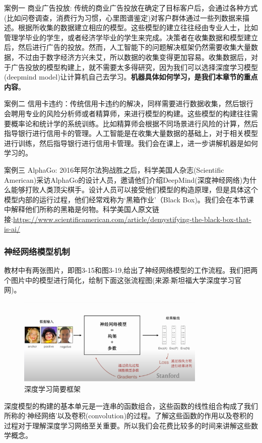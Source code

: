\documentclass[12pt]{article}
\numberwithin{figure}{section}
\newenvironment{fullmodel}{
			\smallskip\noindent
			\begin{minipage}{\textwidth+\marginparwidth+\marginparsep}\smallskip\smallskip}
			{\smallskip\smallskip\end{minipage}\vspace{.1in}
			}
\numberwithin{equation}{section}
\begin{document}

\noindent
\textcolor{deepramp}{案例一} 商业广告投放: 传统的商业广告投放在确定了目标客户后，会通过各种方式(比如问卷调查，消费行为习惯，心里图谱鉴定)对客户群体通过一些列数据来描述。根据所收集的数据建立相应的模型。这些模型的建立往往经由专业人士，比如管理学毕业的学生，或者经济学毕业的学生来完成。决策者在收集数据和模型建立后，然后进行广告的投放。然而，人工智能下的问题解决框架仍然需要收集大量数据，不过由于数字经济方兴未艾，所以数据的收集变得更加容易。收集数据后，对于广告投放的模型构建上，就不需要太多得研究，因为我们可以选择深度学习模型(deepmind model)让计算机自己去学习。\textbf{机器具体如何学习，是我们本章节的重点内容}。

\hfil

\noindent
\textcolor{deepramp}{案例二} 信用卡违约：传统信用卡违约的解决，同样需要进行数据收集，然后银行会聘用专业的风险分析师或者精算师，来进行模型的构建。这些模型的构建往往需要概率论和统计学的系统训练。比如精算师会根据不同场景进行风险的计算，然后指导银行进行信用卡的管理。人工智能是在收集大量数据的基础上，对于相关模型进行训练，然后指导银行进行信用卡管理。我们会在课上，进一步讲解机器是如何学习的。

\hfil

\noindent
\textcolor{deepramp}{案例三} AlphaGo: 2016年阿尔法狗战胜之后，科学美国人杂志(Scientific American)采访AlphaGo的设计人员，邀请他们介绍DeepMind(深度神经网络)为什么能够打败人类顶尖棋手。设计人员可以接受他们模型的构造原理，但是具体这个模型内部的运行过程，他们经常戏称为`黑箱作业'（Black Box)。我们会在本节课中解释他们所称的黑箱是何物。科学美国人原文链接:\url{https://www.scientificamerican.com/article/demystifying-the-black-box-that-is-ai/}


\subsubsection{神经网络模型机制}

\begin{fullmodel}
	教材中有两张图片，即图3-15和图3-19,给出了神经网络模型的工作流程。我们把两个图片中的模型进行简化，绘制下面这张流程图(来源:斯坦福大学深度学习官网)。
\begin{figure}[H]
	\centering
	\includegraphics[width=0.8\textwidth]{fig/deepmindflow}
	\caption{深度学习简要框架}
\end{figure}
深度模型的构建的基本单元是一连串的函数组合，这些函数的线性组合构成了我们所称的`神经网络'以及卷积(convolution)的过程。了解这些函数的作用以及卷积的过程对于理解深度学习网络至关重要。所以我们会花费比较多的时间来讲解这些数学概念。
\end{fullmodel}
\end{document}
